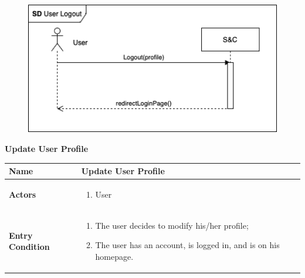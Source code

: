 \begin{enumerate}[label=\textbf{[US\arabic*]}, left = 0pt, align = left]
\begin{longtable}{|l|p{11cm}|}
            \end{longtable}

            \newpage
            \begin{figure}[h!]
                \centering
                    \includegraphics[width=1\textwidth]{RASD/Images/UseCases/US02_UserLogout.drawio.png}
                \label{fig:example}
            \end{figure}

            \newpage
            
            \item \textbf{Update User Profile}
            
            \begin{longtable}{|l|p{11cm}|}  
                \hline
                \textbf{Name} & 
                    \textbf{Update User Profile} \\
                \hline
                
                \textbf{Actors} & 
                    \begin{enumerate}[label=\textbullet, itemsep=0em]
                        \item User
                    \end{enumerate} \\
                \hline

                \textbf{Entry Condition} & 
                    \begin{enumerate}[label=\textbullet, itemsep=0em]
                        \item The user decides to modify his/her profile;
                        \item The user has an account, is logged in, and is on his homepage.
                    \end{enumerate} \\
                \hline
                

\end{longtable}
\end{enumerate}
